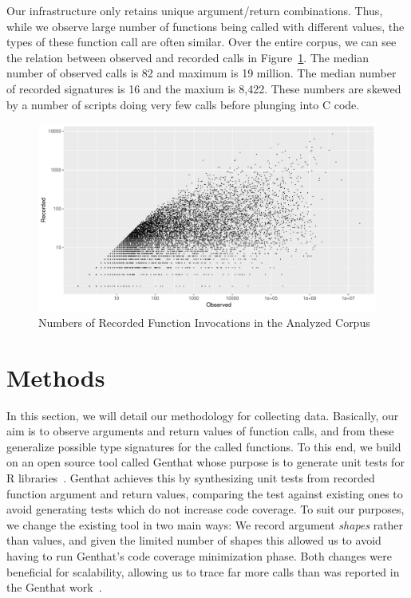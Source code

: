 \documentclass[acmsmall,10pt,review,anonymous]{acmart}\settopmatter{printfolios=true,printccs=false,printacmref=false}
\newcommand{\genthat}{{\sc Genthat}\xspace}
\begin{document}
Our infrastructure only retains unique argument/return combinations. Thus,
while we observe large number of functions being called with different
values, the types of these function call are often similar. Over the entire
corpus, we can see the relation between observed and recorded calls in
Figure~\ref{recorded}.  The median number of observed calls is 82 and
maximum is 19 million.  The median number of recorded signatures is 16 and
the maxium is 8,422. These numbers are skewed by a number of scripts doing
very few calls before plunging into C code.

\begin{figure}[htbp]\begin{center}
\includegraphics[width=.9\textwidth]{recordsbypkg}
\caption{Numbers of Recorded Function Invocations in the Analyzed Corpus}
\label{recorded}\end{center}
\end{figure}

\newpage
\section{Methods}

In this section, we will detail our methodology for collecting data.  
Basically, our aim is to observe arguments and return values of function calls, and from these generalize possible type signatures for the called functions. 
To this end, we build on an open source tool called \genthat whose purpose is to generate unit tests for R libraries~\cite{issta18}.  
\genthat achieves this by synthesizing unit tests from recorded function argument and return values, comparing the test against existing ones to avoid generating tests which do not increase code coverage.
To suit our purposes, we change the existing tool in two main ways: 
We record argument \emph{shapes} rather than values, and given the limited number of shapes this allowed us to avoid having to run \genthat's code coverage minimization phase. 
Both changes were beneficial for scalability, allowing us to trace far more calls than was reported in the \genthat work~\cite{issta18}.
\end{document}

